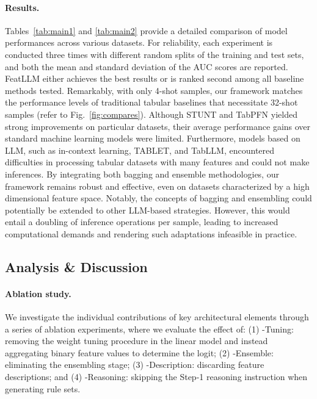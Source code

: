 \vspace*{-0.12in}
\paragraph{Results.}
Tables~\ref{tab:main1} and \ref{tab:main2} provide a detailed comparison of model performances across various datasets. For reliability, each experiment is conducted three times with different random splits of the training and test sets, and both the mean and standard deviation of the AUC scores are reported. \textsf{FeatLLM} either achieves the best results or is ranked second among all baseline methods tested. Remarkably, with only 4-shot samples, our framework matches the performance levels of traditional tabular baselines that necessitate 32-shot samples (refer to Fig.~\ref{fig:compares}). Although STUNT and TabPFN yielded strong improvements on particular datasets, their average performance gains over standard machine learning models were limited. Furthermore, models based on LLM, such as in-context learning, TABLET, and TabLLM, encountered difficulties in processing tabular datasets with many features and could not make inferences. By integrating both bagging and ensemble methodologies, our framework remains robust and effective, even on datasets characterized by a high dimensional feature space. Notably, the concepts of bagging and ensembling could potentially be extended to other LLM-based strategies. However, this would entail a doubling of inference operations per sample, leading to increased computational demands and rendering such adaptations infeasible in practice. 

\subsection{Analysis \& Discussion}
\label{sec:analysis}
\paragraph{Ablation study.} We investigate the individual contributions of key architectural elements through a series of ablation experiments, where we evaluate the effect of: (1) \textsf{-Tuning}: removing the weight tuning procedure in the linear model and instead aggregating binary feature values to determine the logit; (2) \textsf{-Ensemble}: eliminating the ensembling stage; (3) \textsf{-Description}: discarding feature descriptions; and (4) \textsf{-Reasoning}: skipping the Step-1 reasoning instruction when generating rule sets.

